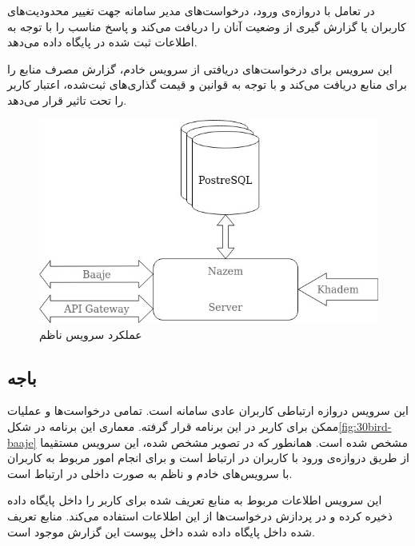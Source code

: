 در تعامل با ‌دروازه‌ی ورود، درخواست‌های مدیر سامانه جهت تغییر محدودیت‌های کاربران یا گزارش گیری از وضعیت آنان را دریافت می‌کند و پاسخ مناسب را با توجه به اطلاعات ثبت شده در پایگاه داده می‌دهد.

این سرویس برای درخواست‌های دریافتی از سرویس خادم، گزارش مصرف منابع را برای منابع دریافت می‌کند و با توجه به قوانین و قیمت گذاری‌های ثبت‌شده، اعتبار کاربر را تحت تاثیر قرار می‌دهد.

\begin{figure}
	\vspace{1cm}
	\centering
	\includegraphics[scale=0.7]{figures/30bird-nazem.jpg}
	\caption{عملکرد سرویس ناظم}
	\label{fig:30bird-nazem}
\end{figure}


\subsection{باجه}
این سرویس دروازه ارتباطی کاربران عادی سامانه است. تمامی درخواست‌ها و عملیات ممکن برای کاربر در این برنامه قرار گرفته. معماری این برنامه در شکل\ref{fig:30bird-baaje} مشخص شده است. همانطور که در تصویر مشخص شده، این سرویس مستقیما از طریق ‌دروازه‌ی ورود با کاربران در ارتباط است و برای انجام امور مربوط به کاربران با سرویس‌های خادم و ناظم به صورت داخلی در ارتباط است.


این سرویس اطلاعات مربوط به منابع تعریف شده برای کاربر را داخل پایگاه داده ذخیره کرده و در پردازش درخواست‌ها از این اطلاعات استفاده می‌کند. منابع تعریف شده داخل پایگاه داده شده داخل پیوست این گزارش موجود است.

